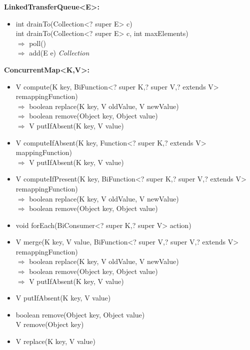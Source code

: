 \documentclass[]{usiinfthesis}
\begin{document}
{\noindent
\textbf{LinkedTransferQueue<E>:}
\begin{itemize}
    \item   int drainTo(Collection<? super E> c)
    \mbox{}\\   int drainTo(Collection<? super E> c, int maxElements)
    \mbox{}\\ $\Rightarrow$   poll()
    \mbox{}\\ $\Rightarrow$ add(E e)		\textit{Collection}
\end{itemize}

\noindent
\textbf{ConcurrentMap<K,V>:}
\begin{itemize}
    \item   V compute(K key, BiFunction<? super K,? super V,? extends V> remappingFunction)
    \mbox{}\\ $\Rightarrow$   boolean replace(K key, V oldValue, V newValue)
    \mbox{}\\ $\Rightarrow$   boolean remove(Object key, Object value)
    \mbox{}\\ $\Rightarrow$   V putIfAbsent(K key, V value)
    \item   V computeIfAbsent(K key, Function<? super K,? extends V> mappingFunction)
    \mbox{}\\ $\Rightarrow$   V putIfAbsent(K key, V value)
    \item   V computeIfPresent(K key, BiFunction<? super K,? super V,? extends V> remappingFunction)
    \mbox{}\\ $\Rightarrow$   boolean replace(K key, V oldValue, V newValue)
    \mbox{}\\ $\Rightarrow$   boolean remove(Object key, Object value)
    \item   void forEach(BiConsumer<? super K,? super V> action)
    \item   V merge(K key, V value, BiFunction<? super V,? super V,? extends V> remappingFunction)
    \mbox{}\\ $\Rightarrow$   boolean replace(K key, V oldValue, V newValue)
    \mbox{}\\ $\Rightarrow$   boolean remove(Object key, Object value)
    \mbox{}\\ $\Rightarrow$   V putIfAbsent(K key, V value)
    \item   V putIfAbsent(K key, V value)
    \item   boolean remove(Object key, Object value)
    \mbox{}\\      V remove(Object key)
    \item   V replace(K key, V value)

\end{itemize}}
\end{document}
